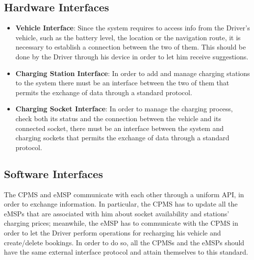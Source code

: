 \subsection{Hardware Interfaces}
\label{subsec:hardwareInterfaces}
\begin{itemize}
    \item \textbf{Vehicle Interface}: Since the system requires to access info from the Driver's vehicle, such as the battery level, the location or the navigation route, it is necessary to establish a connection between the two of them. This should be done by the Driver through his device in order to let him receive suggestions.
    \item \textbf{Charging Station Interface}: In order to add and manage charging stations to the system there must be an interface between the two of them that permits the exchange of data through a standard protocol.
    \item \textbf{Charging Socket Interface}: In order to manage the charging process, check both its status and the connection between the vehicle and its connected socket, there must be an interface between the system and charging sockets that permits the exchange of data through a standard protocol.
\end{itemize}
\subsection{Software Interfaces}
\label{subsec:softwareInterfaces}
The CPMS and eMSP communicate with each other through a uniform API, in order to exchange information. In particular, the CPMS has to update all the eMSPs that are associated with him about socket availability and stations' charging prices; meanwhile, the eMSP has to communicate with the CPMS in order to let the Driver perform operations for recharging his vehicle and create/delete bookings. In order to do so, all the CPMSs and the eMSPs should have the same external interface protocol and attain themselves to this standard.
